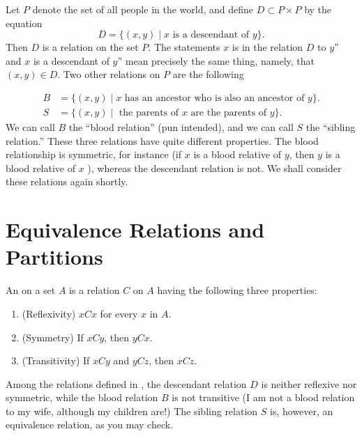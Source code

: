 \begin{centeredblock*}
 \begin{example}
\label{ex:\thesection.\theexample}
 Let \(P\) denote the set of all people in the world, and define \(D \subset P \times P\) by the equation
 \[
 D = \{ ({x,y}) \mid x\text{ is a descendant of }y\}.
 \]
 Then \(D\) is a relation on the set \(P\). The statements \(x\) is in the relation \(D\) to \(y\)'' and \(x\) is a descendant of \(y\)'' mean precisely the same thing, namely, that \(({x,y}) \in D\). Two other relations on \(P\) are the following

 \[
 \begin{aligned}
 B &= \{ ({x,y}) \mid x\text{ has an ancestor who is also an ancestor of }y\} \text{.} \\
 S &= \{ ({x,y}) \mid \text{ the parents of }x\text{ are the parents of }y\} \text{.}
 \end{aligned}
 \]
 We can call \(B\) the ``blood relation'' (pun intended), and we can call \(S\) the ``sibling relation.'' These three relations have quite different properties. The blood relationship is symmetric, for instance (if \(x\) is a blood relative of \(y\), then \(y\) is a blood relative of \(x\) ), whereas the descendant relation is not. We shall consider these relations again shortly.
 \end{example}
\end{centeredblock*}

\section*{Equivalence Relations and Partitions}

An  on a set \(A\) is a relation \(C\) on \(A\) having the following three properties:

\begin{enumerate}[itemsep=0.2em, parsep=0pt, topsep=0pt, partopsep=0pt, leftmargin=*, label=(\arabic*), align=left]
\item (Reflexivity) \({xCx}\) for every \(x\) in \(A\).

\item (Symmetry) If \({xCy}\), then \({yCx}\).

\item (Transitivity) If \({xCy}\) and \({yCz}\), then \({xCz}\).
\end{enumerate}

\begin{centeredblock}
 \begin{example}
\label{ex:\thesection.\theexample}
 Among the relations defined in , the descendant relation \(D\) is neither reflexive nor symmetric, while the blood relation \(B\) is not transitive (I am not a blood relation to my wife, although my children are!) The sibling relation \(S\) is, however, an equivalence relation, as you may check.
 \end{example}
\end{centeredblock}

